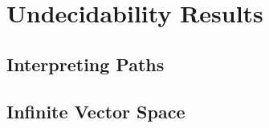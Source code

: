 \section{Undecidability Results}
\label{sec:undecidability}

\subsection{Interpreting Paths}
\label{subsec:paths}


\subsection{Infinite Vector Space}
\label{subsec:vector}





